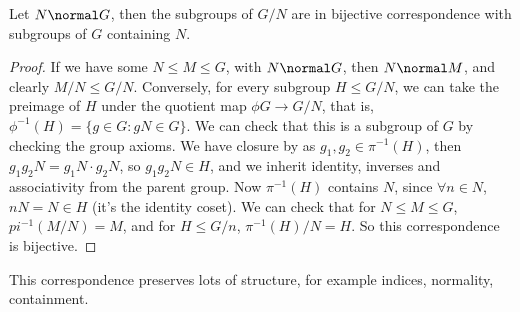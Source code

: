 \begin{theorem}
	Let $N \normal G$, then the subgroups of $G/N$ are in bijective correspondence with subgroups of $G$ containing $N$.
\end{theorem}
\begin{proof}
	If we have some $N \leq M \leq G$, with $N \normal G$, then $N \normal M$, and clearly $M/N \leq G/N$. Conversely, for every subgroup $H \leq G/N$, we can take the preimage of $H$ under the quotient map $\phi G \rightarrow G/N$, that is, $\phi^{-1}(H) = \{ g \in G : gN \in G \}$. We can check that this is a subgroup of $G$ by checking the group axioms.
	We have closure by as $g_1, g_2 \in \pi^{-1}(H)$, then $g_1 g_2 N = g_1 N \cdot g_2 N$, so $g_1 g_2 N \in H$, and we inherit identity, inverses and associativity from the parent group.
	Now $\pi^{-1}(H)$ contains $N$, since $\forall n \in N$, $nN = N \in H$ (it's the identity coset).
	We can check that for $N \leq M \leq G$, $pi^{-1}(M/N) = M$, and for $H \leq G/n$, $\pi^{-1}(H) / N = H$. So this correspondence is bijective.
\end{proof}

This correspondence preserves lots of structure, for example indices, normality, containment.

